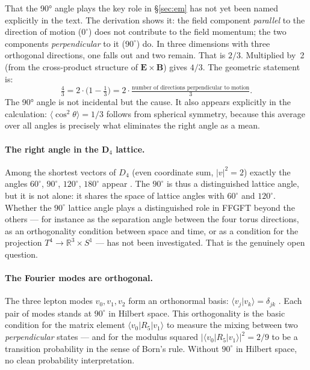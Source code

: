 That the 90° angle plays the key role in \S\ref{sec:em} has not yet been
named explicitly in the text. The derivation shows it: the field component
\emph{parallel} to the direction of motion ($0^\circ$) does not contribute to
the field momentum; the two components \emph{perpendicular} to it ($90^\circ$)
do. In three dimensions with three orthogonal directions, one falls out and two
remain. That is $2/3$. Multiplied by~2 (from the cross-product structure of
$\mathbf E\times\mathbf B$) gives $4/3$. The geometric statement is:
\begin{equation}
  \tfrac43 = 2 \cdot \bigl(1 - \tfrac13\bigr) = 2 \cdot
  \tfrac{\text{number of directions perpendicular to motion}}{3}.
\end{equation}
The 90° angle is not incidental but the cause. It also appears explicitly in the
calculation: $\langle\cos^2\theta\rangle = 1/3$ follows from spherical symmetry,
because this average over all angles is precisely what eliminates the right angle
as a mean.

\paragraph{The right angle in the D$_4$ lattice.}
Among the shortest vectors of $D_4$ (even coordinate sum, $|v|^2 = 2$)
exactly the angles $60^\circ$, $90^\circ$, $120^\circ$, $180^\circ$ appear
\BM. The $90^\circ$ is thus a distinguished lattice angle, but it is not alone:
it shares the space of lattice angles with $60^\circ$ and $120^\circ$. Whether
the $90^\circ$ lattice angle plays a distinguished role in FFGFT beyond the
others --- for instance as the separation angle between the four torus
directions, as an orthogonality condition between space and time, or as a
condition for the projection $T^4 \to \mathbb R^3 \times S^1$ --- has not been
investigated. That is the genuinely open question.

\paragraph{The Fourier modes are orthogonal.}
The three lepton modes $v_0, v_1, v_2$ form an orthonormal basis:
$\langle v_j | v_k\rangle = \delta_{jk}$ \BM. Each pair of modes stands at
$90^\circ$ in Hilbert space. This orthogonality is the basic condition for the
matrix element $\langle v_0 | R_5 | v_1\rangle$ to measure the mixing between
two \emph{perpendicular} states --- and for the modulus squared
$|\langle v_0|R_5|v_1\rangle|^2 = 2/9$ to be a transition probability in the
sense of Born's rule. Without $90^\circ$ in Hilbert space, no clean probability
interpretation.


